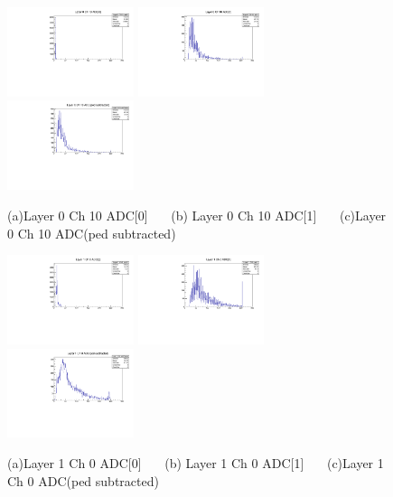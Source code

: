 \documentclass[a4paper,11pt]{article}
\theoremstyle{mytheor}
\begin{document}
\begin{figure}[H] 
\vspace*{-0.3cm} 
\includegraphics[width=0.33\textwidth,scale=0.5,trim=0 0 0 0,clip]{plotsdir/file0_muons-Layer0_Ch10_adc0-1.pdf} 
\includegraphics[width=0.33\textwidth,scale=0.5,trim=0 0 0 0,clip]{plotsdir/file0_muons-Layer0_Ch10_adc1-1.pdf} 
\includegraphics[width=0.33\textwidth,scale=0.5,trim=0 0 0 0,clip]{plotsdir/file0_muons-Layer0_Ch10_adcPedsub-1.pdf} 
\caption{(a)Layer 0 Ch 10 ADC[0] ~~~(b) Layer 0 Ch 10 ADC[1] ~~~(c)Layer 0 Ch 10 ADC(ped subtracted) } 
\end{figure} 
\begin{figure}[H] 
\vspace*{-0.3cm} 
\includegraphics[width=0.33\textwidth,scale=0.5,trim=0 0 0 0,clip]{plotsdir/file0_muons-Layer1_Ch0_adc0-1.pdf} 
\includegraphics[width=0.33\textwidth,scale=0.5,trim=0 0 0 0,clip]{plotsdir/file0_muons-Layer1_Ch0_adc1-1.pdf} 
\includegraphics[width=0.33\textwidth,scale=0.5,trim=0 0 0 0,clip]{plotsdir/file0_muons-Layer1_Ch0_adcPedsub-1.pdf} 
\caption{(a)Layer 1 Ch 0 ADC[0] ~~~(b) Layer 1 Ch 0 ADC[1] ~~~(c)Layer 1 Ch 0 ADC(ped subtracted) } 
\end{figure} 
\end{document}
